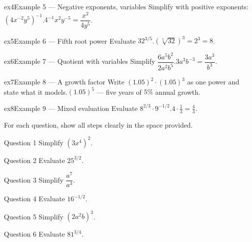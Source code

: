 \documentclass[11pt]{article}
\begin{document}
\begin{example}{ex4}{Example 5 --- Negative exponents, variables}
Simplify with positive exponents: $(4x^{-2}y^5)^{-1}$.\soln $4^{-1}x^2y^{-5}=\dfrac{x^2}{4y^5}$.
\end{example}

\begin{example}{ex5}{Example 6 --- Fifth root power}
Evaluate $32^{3/5}$.\soln $(\sqrt[5]{32})^3=2^3=8$.
\end{example}

\begin{example}{ex6}{Example 7 --- Quotient with variables}
Simplify $\dfrac{6a^5b^2}{2a^2b^5}$.\soln $3a^{3}b^{-3}=\dfrac{3a^3}{b^3}$.
\end{example}

\begin{example}{ex7}{Example 8 --- A growth factor}
Write $(1.05)^2\cdot(1.05)^3$ as one power and state what it models.\soln $(1.05)^5$ — five years of $5\%$ annual growth.
\end{example}

\begin{example}{ex8}{Example 9 --- Mixed evaluation}
Evaluate $8^{2/3}\cdot 9^{-1/2}$.\soln $4\cdot\tfrac13=\tfrac43$.
\end{example}

\clearpage
{}
For each question, show all steps clearly in the space provided.

\begin{qbox}{Question 1}
Simplify $(3x^4)^2$.\workspace{2.4cm}
\end{qbox}

\begin{qbox}{Question 2}
Evaluate $25^{3/2}$.\workspace{2.4cm}
\end{qbox}

\begin{qbox}{Question 3}
Simplify $\dfrac{a^7}{a^3}$.\workspace{2.4cm}
\end{qbox}

\begin{qbox}{Question 4}
Evaluate $16^{-1/2}$.\workspace{2.4cm}
\end{qbox}

\begin{qbox}{Question 5}
Simplify $(2a^2b)^3$.\workspace{2.4cm}
\end{qbox}

\begin{qbox}{Question 6}
Evaluate $81^{3/4}$.\workspace{2.4cm}
\end{qbox}
\end{document}
